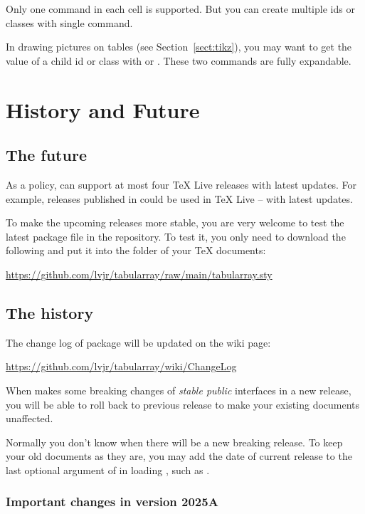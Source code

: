 \documentclass[oneside]{book}
\renewcommand\emph[1]{\textit{\color{red3}#1}}
\begin{document}
{Only one \CC{\SetChild} command in each cell is supported.
But you can create multiple ids or classes with single \CC{\SetChild} command.

In drawing  pictures on tables (see Section~\ref{sect:tikz}),
you may want to get the value of a child id or class with \CC{\ExpTblrChildId} or \CC{\ExpTblrChildClass}.
These two commands are fully expandable.

\chapter{History and Future}

\section{The future}

As a policy,  can support at most four TeX Live releases with latest updates.
For example,  releases published in \the\year{} could be used in TeX Live
--\the\year{} with latest updates.

To make the upcoming releases more stable, you are very welcome to test the latest package file
in the repository. To test it, you only need to download the following 
and put it into the folder of your TeX documents:\newline
\centerline{\url{https://github.com/lvjr/tabularray/raw/main/tabularray.sty}}

\section{The history}

The change log of  package will be updated on the wiki page:\newline
\centerline{\url{https://github.com/lvjr/tabularray/wiki/ChangeLog}}

When  makes some breaking changes of \emph{stable public} interfaces in a new release,
you will be able to roll back to previous release to make your existing documents unaffected.

Normally you don't know when there will be a new breaking release.
To keep your old documents as they are, you may add the date of current release
to the last optional argument of \CC{\usepackage} in loading ,
such as \CC{\usepackage{tabularray}[=2024-02-16]}.

\subsection{Important changes in version 2025A}

}
\end{document}
